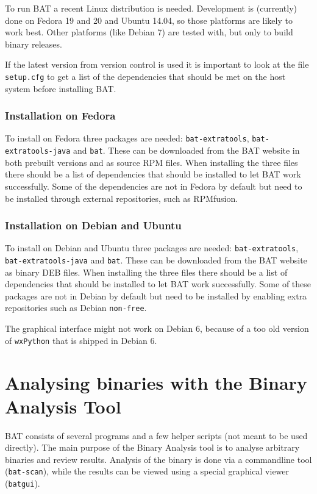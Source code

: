 \documentclass[10pt]{article}
\begin{document}
To run BAT a recent Linux distribution is needed. Development is (currently)
done on Fedora 19 and 20 and Ubuntu 14.04, so those platforms are likely to
work best. Other platforms (like Debian 7) are tested with, but only to
build binary releases.

If the latest version from version control is used it is important to look at
the file \texttt{setup.cfg} to get a list of the dependencies that should be
met on the host system before installing BAT.

\subsubsection{Installation on Fedora}

To install on Fedora three packages are needed:
\texttt{bat-extratools}, \texttt{bat-extratools-java} and \texttt{bat}. These
can be downloaded from the BAT website in both prebuilt versions and as source
RPM files. When installing the three files there should be a list of
dependencies that should be installed to let BAT work successfully. Some of
the dependencies are not in Fedora by default but need to be installed through
external repositories, such as RPMfusion.

\subsubsection{Installation on Debian and Ubuntu}

To install on Debian and Ubuntu three packages are needed:
\texttt{bat-extratools}, \texttt{bat-extratools-java} and \texttt{bat}. These
can be downloaded from the BAT website as binary DEB files. When installing the
three files there should be a list of dependencies that should be installed to
let BAT work successfully. Some of these packages are not in Debian by default
but need to be installed by enabling extra repositories such as Debian
\texttt{non-free}.

The graphical interface might not work on Debian 6, because of a too old
version of \texttt{wxPython} that is shipped in Debian 6.

\section{Analysing binaries with the Binary Analysis Tool}

BAT consists of several programs and a few helper scripts (not meant to be
used directly). The main purpose of the Binary Analysis tool is to analyse
arbitrary binaries and review results. Analysis of the binary is done via
a commandline tool (\texttt{bat-scan}), while the results can be viewed using
a special graphical viewer (\texttt{batgui}).
\end{document}
